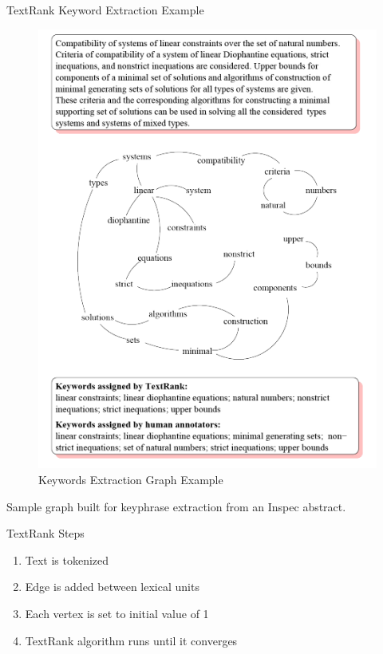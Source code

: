 \documentclass[10pt]{beamer}
\begin{document}
{
\begin{frame}{TextRank Keyword Extraction Example}
\begin{figure}\caption{Keywords Extraction Graph Example}
	\center
	\includegraphics[scale=0.5]{images/mihalcea_pg4.pdf}
\end{figure} 
\begin{center}
\tiny Sample graph built for keyphrase extraction from an Inspec abstract.
\end{center}
\end{frame}
}
\begin{frame}{TextRank Steps}
  \begin{enumerate}[<+- | alert@+>]
    \item Text is tokenized
    \item Edge is added between lexical units
    \item Each vertex is set to initial value of 1
    \item TextRank algorithm runs until it converges
  \end{enumerate}
\end{frame}
\end{document}
